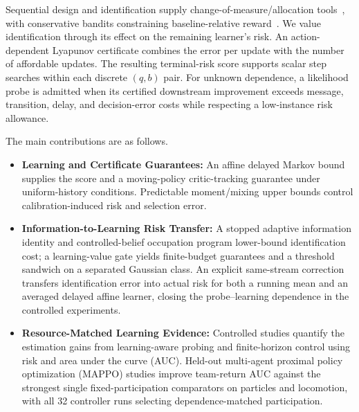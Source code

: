 \documentclass[journal]{IEEEtran}
\begin{document}
Sequential design and identification supply change-of-measure/allocation tools~\cite{chernoff1959sequential,nitinawarat2015controlled,kaufmann2016complexity,garivier2016optimal,moulos2019markovian,saad2023covariance,vannella2023multiagent}, with conservative bandits constraining baseline-relative reward~\cite{wu2016conservative}.
We value identification through its effect on the remaining learner's risk.
An action-dependent Lyapunov certificate combines the error per update with the number of affordable updates.
The resulting terminal-risk score supports scalar step searches within each discrete $(q,b)$ pair.
For unknown dependence, a likelihood probe is admitted when its certified downstream improvement exceeds message, transition, delay, and decision-error costs while respecting a low-instance risk allowance.

The main contributions are as follows.
\begin{itemize}
\item \textbf{Learning and Certificate Guarantees:} An affine delayed Markov bound supplies the score and a moving-policy critic-tracking guarantee under uniform-history conditions.
Predictable moment/mixing upper bounds control calibration-induced risk and selection error.
\item \textbf{Information-to-Learning Risk Transfer:} A stopped adaptive information identity and controlled-belief occupation program lower-bound identification cost; a learning-value gate yields finite-budget guarantees and a threshold sandwich on a separated Gaussian class.
An explicit same-stream correction transfers identification error into actual risk for both a running mean and an averaged delayed affine learner, closing the probe--learning dependence in the controlled experiments.
\item \textbf{Resource-Matched Learning Evidence:} Controlled studies quantify the estimation gains from learning-aware probing and finite-horizon control using risk and area under the curve (AUC).
Held-out multi-agent proximal policy optimization (MAPPO) studies improve team-return AUC against the strongest single fixed-participation comparators on particles and locomotion, with all 32 controller runs selecting dependence-matched participation.
\end{itemize}
\end{document}
